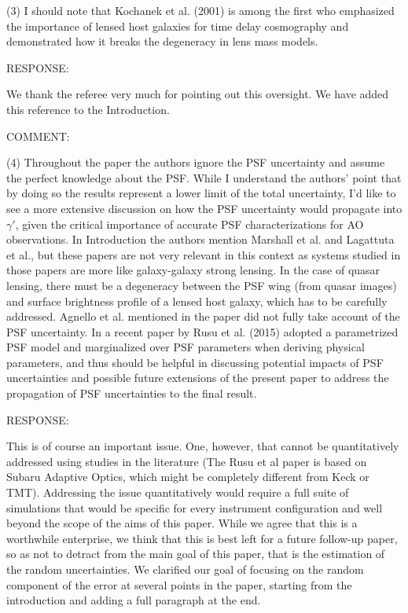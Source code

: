\documentclass[a4paper,11pt]{article}
\begin{document}
(3) I should note that Kochanek et al. (2001) is among the first 
who emphasized the importance of lensed host galaxies 
for time delay cosmography and demonstrated 
how it breaks the degeneracy in lens mass models.


RESPONSE:

We thank the referee very much for pointing out this oversight.  We
have added this reference to the Introduction.

COMMENT:

(4) Throughout the paper the authors ignore the PSF uncertainty and
assume the perfect knowledge about the PSF. While I understand the
authors' point that by doing so the results represent a lower limit of
the total uncertainty, I'd like to see a more extensive discussion on
how the PSF uncertainty would propagate into $\gamma'$, given the
critical importance of accurate PSF characterizations for AO
observations. In Introduction the authors mention Marshall et al. and
Lagattuta et al., but these papers are not very relevant in this
context as systems studied in those papers are more like galaxy-galaxy
strong lensing. In the case of quasar lensing, there must be a
degeneracy between the PSF wing (from quasar images) and surface
brightness profile of a lensed host galaxy, which has to be carefully
addressed. Agnello et al. mentioned in the paper did not fully take
account of the PSF uncertainty. In a recent paper by Rusu et
al. (2015) adopted a parametrized PSF model and marginalized over PSF
parameters when deriving physical parameters, and thus should be
helpful in discussing potential impacts of PSF uncertainties and
possible future extensions of the present paper to address the
propagation of PSF uncertainties to the final result.

RESPONSE:

This is of course an important issue. One, however, that cannot be
quantitatively addressed using studies in the literature (The Rusu et
al paper is based on Subaru Adaptive Optics, which might be completely
different from Keck or TMT). Addressing the issue quantitatively would
require a full suite of simulations that would be specific for every
instrument configuration and well beyond the scope of the aims of this
paper. While we agree that this is a worthwhile enterprise, we think
that this is best left for a future follow-up paper, so as not to
detract from the main goal of this paper, that is the estimation of
the random uncertainties. We clarified our goal of focusing on the
random component of the error at several points in the paper, starting
from the introduction and adding a full paragraph at the end.
\end{document}
